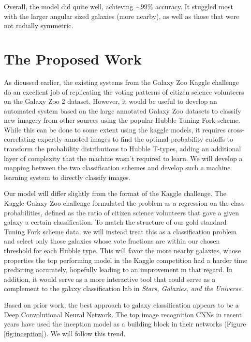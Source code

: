 \documentclass{article}
\begin{document}
Overall, the model did quite well, achieving $\sim 99\%$ accuracy. It stuggled most with the larger angular sized galaxies (more nearby), as well as those that were not radially symmetric.



\iffalse

\section{The Proposed Work}
As dicussed earlier, the existing systems from the Galaxy Zoo Kaggle challenge do an excellent job of replicating the voting patterns of citizen science volunteers on the Galaxy Zoo 2 dataset. However, it would be useful to develop an automated system based on the large annotated Galaxy Zoo datasets to classify new imagery from other sources using the popular Hubble Tuning Fork scheme. While this can be done to some extent using the kaggle models, it requires cross-correlating expertly annoted images to find the optimal probability cutoffs to transform the probability distributions to Hubble T-types, adding an additional layer of complexity that the machine wasn't required to learn. We will develop a mapping between the two classification schemes and develop such a machine learning system to directly classify images. 

Our model will differ slightly from the format of the Kaggle challenge. The Kaggle Galaxy Zoo challenge formulated the problem as a regression on the class probabilities, defined as the ratio of citizen science volunteers that gave a given galaxy a certain classification. To match the structure of our gold standard Tuning Fork scheme data, we will instead treat this as a classification problem and select only those galaxies whose vote fractions are within our chosen threshold for each Hubble type. This will favor the more nearby galaxies, whose properties the top performing model in the Kaggle competition had a harder time predicting accurately, hopefully leading to an improvement in that regard. In addition, it would serve as a more interactive tool that could serve as a complement to the galaxy classification lab in \emph{Stars, Galaxies, and the Universe}.

Based on prior work, the best approach to galaxy classification appears to be a Deep Convolutional Neural Network. The top image recognition CNNs in recent years have used the inception model \citep{2014arXiv1409.4842S} as a building block in their networks (Figure \ref{fig:inception}). We will follow this trend.
\end{document}
